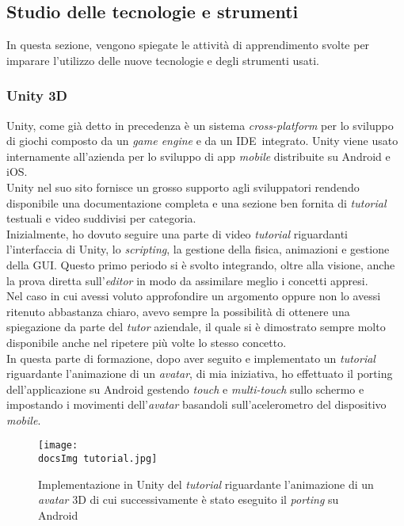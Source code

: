 \subsection{Studio delle tecnologie e strumenti}
In questa sezione, vengono spiegate le attivit\`a di apprendimento svolte per imparare l'utilizzo delle nuove tecnologie e degli strumenti usati.
\subsubsection{Unity 3D}
Unity, come gi\`a detto in precedenza \`e un sistema \textit{cross-platform\gloss} per lo sviluppo di giochi composto da un \textit{game engine} e da un IDE\gloss\ integrato. Unity viene usato internamente all'azienda per lo sviluppo di app \textit{mobile} distribuite su Android e iOS.
\\
Unity nel suo sito fornisce un grosso supporto agli sviluppatori rendendo disponibile una documentazione completa e una sezione ben fornita di \textit{tutorial} testuali e video suddivisi per categoria.\\
Inizialmente, ho dovuto seguire una parte di video \textit{tutorial} riguardanti l'interfaccia di Unity, lo \textit{scripting}, la gestione della fisica, animazioni e gestione della GUI\gloss . Questo primo periodo si \`e svolto integrando, oltre alla visione, anche la prova diretta sull'\textit{editor} in modo da assimilare meglio i concetti appresi.\\
Nel caso in cui avessi voluto approfondire un argomento oppure non lo avessi ritenuto abbastanza chiaro, avevo sempre la possibilit\`a di ottenere una spiegazione da parte del \textit{tutor} aziendale, il quale si \`e dimostrato sempre molto disponibile anche nel ripetere pi\`u volte lo stesso concetto.\\
In questa parte di formazione, dopo aver seguito e implementato un \textit{tutorial} riguardante l'animazione di un \textit{avatar\gloss}, di mia iniziativa, ho effettuato il porting dell'applicazione su Android gestendo \textit{touch} e \textit{multi-touch} sullo schermo e impostando i movimenti dell'\textit{avatar\gloss} basandoli sull'acelerometro del dispositivo \textit{mobile}.

\begin{figure}[H]
	\centering
	\texttt{[image: \\docsImg tutorial.jpg]}
	\caption{Implementazione in Unity del \textit{tutorial} riguardante l'animazione di un \textit{avatar\gloss} 3D di cui successivamente \`e stato eseguito il \textit{porting} su Android}
	\label{fig:tutorial riguardante l'animazione di un avatar\gloss 3D}
\end{figure}
 
